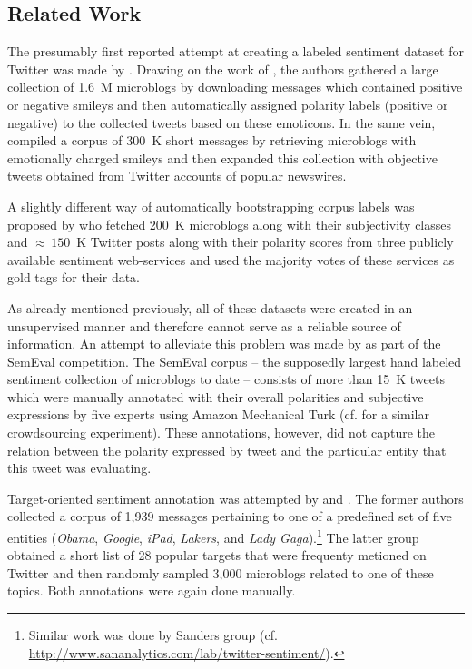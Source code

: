 \subsection{Related Work}
The presumably first reported attempt at creating a labeled sentiment
dataset for Twitter was made by \citet{Go:09}.  Drawing on the work of
\citet{Read:05}, the authors gathered a large collection of 1.6~M
microblogs by downloading messages which contained positive or
negative smileys and then automatically assigned polarity labels
(positive or negative) to the collected tweets based on these
emoticons.  In the same vein, \citet{Pak:10} compiled a corpus of
300~K short messages by retrieving microblogs with emotionally charged
smileys and then expanded this collection with objective tweets
obtained from Twitter accounts of popular newswires.

A slightly different way of automatically bootstrapping corpus labels
was proposed by \citet{Barbosa:10} who fetched 200~K microblogs along
with their subjectivity classes and ${\approx}\,150$~K Twitter posts
along with their polarity scores from three publicly available
sentiment web-services and used the majority votes of these services
as gold tags for their data.

As already mentioned previously, all of these datasets were created in
an unsupervised manner and therefore cannot serve as a reliable source
of information.  An attempt to alleviate this problem was made by
\citet{Nakov:13} as part of the SemEval competition.  The SemEval
corpus -- the supposedly largest hand labeled sentiment collection of
microblogs to date -- consists of more than 15~K tweets which were
manually annotated with their overall polarities and subjective
expressions by five experts using Amazon Mechanical Turk
(cf. \citet{Diakopoulos:10} for a similar crowdsourcing
experiment). These annotations, however, did not capture the relation
between the polarity expressed by tweet and the particular entity that
this tweet was evaluating.

Target-oriented sentiment annotation was attempted by \citet{Jiang:11}
and \citet{Saif:13}.  The former authors collected a corpus of 1,939
messages pertaining to one of a predefined set of five entities
(\emph{Obama}, \emph{Google}, \emph{iPad}, \emph{Lakers}, and
\emph{Lady Gaga}).\footnote{Similar work was done by Sanders group
  (cf. \url{http://www.sananalytics.com/lab/twitter-sentiment/}).} The
latter group obtained a short list of 28 popular targets that were
frequenty metioned on Twitter and then randomly sampled 3,000
microblogs related to one of these topics.  Both annotations were
again done manually.

